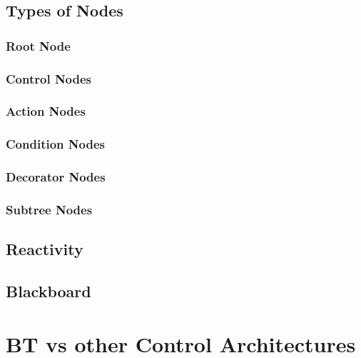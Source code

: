 \subsection{Types of Nodes}

\subsubsection{Root Node} 

\subsubsection{Control Nodes} 
\label{subsubsec:control_nodes}

\subsubsection{Action Nodes}

\subsubsection{Condition Nodes}

\subsubsection{Decorator Nodes}

\subsubsection{Subtree Nodes}

\subsection{Reactivity}

\subsection{Blackboard}


\cite{BlackboardDesignPattern}


\section{BT vs other Control Architectures}
